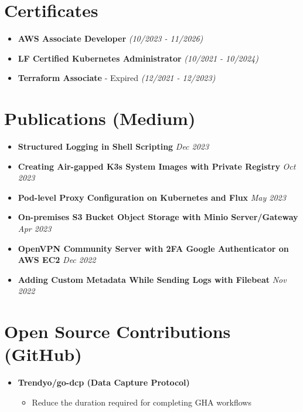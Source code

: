 \documentclass[a4paper,10pt]{article}
\begin{document}
\section*{Certificates}
\begin{itemize}[leftmargin=0.5cm]
    \item \textbf{AWS Associate Developer} \hfill \textit{(10/2023 - 11/2026)}
    \item \textbf{LF Certified Kubernetes Administrator} \hfill \textit{(10/2021 - 10/2024)}
    \item \textbf{Terraform Associate} - Expired \hfill \textit{(12/2021 - 12/2023)}
\end{itemize}

\section*{Publications (Medium)}
\begin{itemize}[leftmargin=0.5cm]
    \item \textbf{Structured Logging in Shell Scripting} \hfill \textit{Dec 2023}
    \item \textbf{Creating Air-gapped K3s System Images with Private Registry} \hfill \textit{Oct 2023}
    \item \textbf{Pod-level Proxy Configuration on Kubernetes and Flux} \hfill \textit{May 2023}
    \item \textbf{On-premises S3 Bucket Object Storage with Minio Server/Gateway} \hfill \textit{Apr 2023}
    \item \textbf{OpenVPN Community Server with 2FA Google Authenticator on AWS EC2} \hfill \textit{Dec 2022}
    \item \textbf{Adding Custom Metadata While Sending Logs with Filebeat} \hfill \textit{Nov 2022}
\end{itemize}

\section*{Open Source Contributions (GitHub)}
\begin{itemize}[leftmargin=0.5cm]
    \item \textbf{Trendyo/go-dcp (Data Capture Protocol)}
    \begin{itemize}
        \item Reduce the duration required for completing GHA workflows
    \end{itemize}
\end{itemize}
\end{document}
